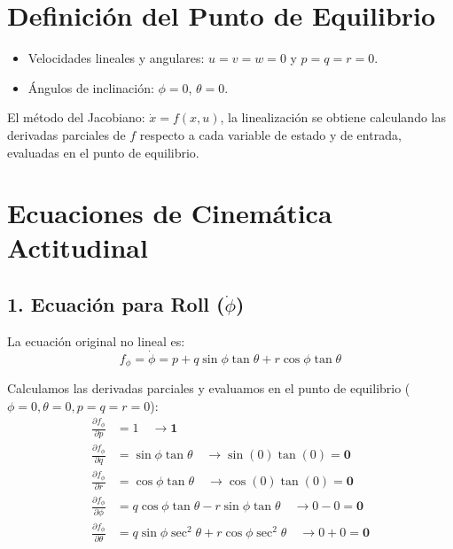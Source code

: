 \documentclass[12pt]{article}
\begin{document}
\section{Definición del Punto de Equilibrio}
\begin{itemize}
    \item Velocidades lineales y angulares: $u = v = w = 0$ y $p = q = r = 0$.
    \item Ángulos de inclinación: $\phi = 0$, $\theta = 0$.
\end{itemize}

El método del Jacobiano: $\dot{x} = f(x, u)$, la linealización se obtiene calculando las derivadas parciales de $f$ respecto a cada variable de estado y de entrada, evaluadas en el punto de equilibrio. 

\vspace{0.5cm}

\section{Ecuaciones de Cinemática Actitudinal}

\subsection{1. Ecuación para Roll ($\dot{\phi}$)}
La ecuación original no lineal es:
\begin{equation}
    f_{\phi} = \dot{\phi} = p + q \sin\phi \tan\theta + r \cos\phi \tan\theta
\end{equation}

Calculamos las derivadas parciales y evaluamos en el punto de equilibrio ($\phi=0, \theta=0, p=q=r=0$):
\begin{align*}
    \frac{\partial f_{\phi}}{\partial p} &= 1 \quad \rightarrow \mathbf{1} \\
    \frac{\partial f_{\phi}}{\partial q} &= \sin\phi \tan\theta \quad \rightarrow \sin(0)\tan(0) = \mathbf{0} \\
    \frac{\partial f_{\phi}}{\partial r} &= \cos\phi \tan\theta \quad \rightarrow \cos(0)\tan(0) = \mathbf{0} \\
    \frac{\partial f_{\phi}}{\partial \phi} &= q \cos\phi \tan\theta - r \sin\phi \tan\theta \quad \rightarrow 0 - 0 = \mathbf{0} \\
    \frac{\partial f_{\phi}}{\partial \theta} &= q \sin\phi \sec^2\theta + r \cos\phi \sec^2\theta \quad \rightarrow 0 + 0 = \mathbf{0}
\end{align*}
\end{document}
